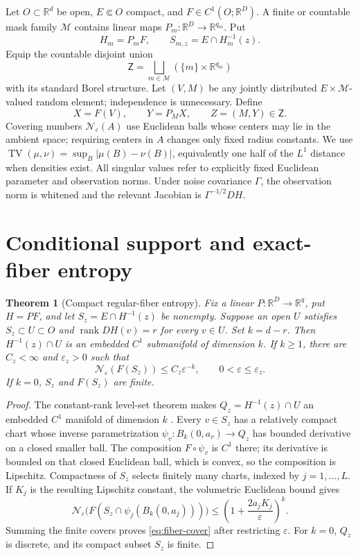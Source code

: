 \documentclass[11pt]{article}
\newtheorem{theorem}{Theorem}[section]
\theoremstyle{definition}
\newcommand{\R}{\mathbb R}
\newcommand{\cN}{\mathcal N}
\newcommand{\rank}{\operatorname{rank}}
\newcommand{\TV}{\operatorname{TV}}
\begin{document}
Let $O\subset\R^d$ be open, $E\Subset O$ compact, and
$F\in C^1(O;\R^D)$.  A finite or countable mask family $\mathcal M$ contains
linear maps $P_m:\R^D\to\R^{q_m}$.  Put
\[
 H_m=P_mF,\qquad S_{m,z}=E\cap H_m^{-1}(z).
\]
Equip the countable disjoint union
\[
 \mathsf Z=\bigsqcup_{m\in\mathcal M}
 (\{m\}\times\R^{q_m})
\]
with its standard Borel structure.  Let $(V,M)$ be any jointly distributed
$E\times\mathcal M$-valued random element; independence is unnecessary.  Define
\[
 X=F(V),\qquad Y=P_MX,\qquad Z=(M,Y)\in\mathsf Z.
\]
Covering numbers $\cN_\varepsilon(A)$ use Euclidean balls whose centers may
lie in the ambient space; requiring centers in $A$ changes only fixed radius
constants.  We use
$\TV(\mu,\nu)=\sup_B|\mu(B)-\nu(B)|$, equivalently one half of the
$L^1$ distance when densities exist.  All singular values refer to explicitly
fixed Euclidean parameter and observation norms.
Under noise covariance $\Gamma$, the observation norm is whitened and the
relevant Jacobian is $\Gamma^{-1/2}DH$.

\section{Conditional support and exact-fiber entropy}

\begin{theorem}[Compact regular-fiber entropy]\label{thm:fiber-entropy}
Fix a linear $P:\R^D\to\R^q$, put $H=PF$, and let
$S_z=E\cap H^{-1}(z)$ be nonempty.  Suppose an open $U$ satisfies
$S_z\subset U\subset O$ and $\rank DH(v)=r$ for every $v\in U$.  Set
$k=d-r$.  Then $H^{-1}(z)\cap U$ is an embedded $C^1$ submanifold of
dimension $k$.  If $k\ge1$, there are $C_z<\infty$ and
$\varepsilon_z>0$ such that
\begin{equation}\label{eq:fiber-cover}
 \cN_\varepsilon(F(S_z))\le C_z\varepsilon^{-k},
 \qquad 0<\varepsilon\le\varepsilon_z.
\end{equation}
If $k=0$, $S_z$ and $F(S_z)$ are finite.
\end{theorem}

\begin{proof}
The constant-rank level-set theorem makes
$Q_z=H^{-1}(z)\cap U$ an embedded $C^1$ manifold of dimension $k$
\citep{lee2013smooth}.  Every $v\in S_z$ has a relatively compact chart whose
inverse parametrization $\psi_v:B_k(0,a_v)\to Q_z$ has bounded derivative on a
closed smaller ball.  The composition $F\circ\psi_v$ is $C^1$ there; its
derivative is bounded on that closed Euclidean ball, which is convex, so the
composition is Lipschitz.  Compactness of $S_z$ selects finitely many charts,
indexed by $j=1,\ldots,L$.  If $K_j$ is the resulting Lipschitz constant, the
volumetric Euclidean bound gives
\[
 \cN_\varepsilon\bigl(F(S_z\cap\psi_j(B_k(0,a_j)))\bigr)
 \le \left(1+\frac{2a_jK_j}{\varepsilon}\right)^k.
\]
Summing the finite covers proves \eqref{eq:fiber-cover} after restricting
$\varepsilon$.  For $k=0$, $Q_z$ is discrete, and its compact subset $S_z$ is
finite.
\end{proof}
\end{document}
